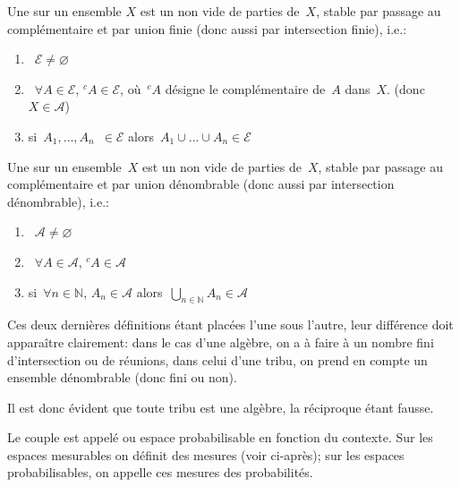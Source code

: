 \medskip
\begin{definition}[Algèbre]
Une  sur un ensemble $X$ est un  non vide de parties de~$X$, stable par passage au complémentaire et par union finie (donc aussi par intersection finie), i.e.:
\begin{enumerate}
 \item~$\mathcal{E} \not=\varnothing$
 \item~$\forall A \in \mathcal{E}$, ${}^c A \in\mathcal{E}$, où~${}^cA$ désigne le complémentaire de~$A$ dans~$X$.
	(donc~$X\in \mathcal{A}$)
\item si~$A_1,\ldots,A_n$~$\in\mathcal{E}$ alors~$A_1\cup ...\cup A_n \in\mathcal{E}$
\end{enumerate}
\end{definition}

\medskip
\begin{definition}[Tribu]\label{Def-tribu}
Une  sur un ensemble~$X$ est un  non vide de parties de~$X$, stable par passage au complémentaire et par union dénombrable (donc aussi par intersection dénombrable), i.e.:
\begin{enumerate}
 \item~$\mathcal{A} \not=\varnothing$
 \item~$\forall A \in \mathcal{A}$, ${}^c A \in\mathcal{A}$%
\item si~$\forall n \in \mathbb{N}$, $A_n \in\mathcal{A}$ alors~$\bigcup_{n\in\mathbb{N}} A_n \in\mathcal{A}$
\end{enumerate}
\end{definition}
\medskipvm
Ces deux dernières définitions étant placées l'une sous l'autre, leur différence doit apparaître clairement: dans le cas d'une algèbre, on a à faire à un nombre fini d'intersection ou de réunions, dans celui d'une tribu, on prend en compte un ensemble dénombrable (donc fini ou non).

\medskip
Il est donc évident que toute tribu est une algèbre, la réciproque étant fausse.

\medskip
\begin{definition}
Le couple  est appelé  ou espace probabilisable en fonction du contexte.
Sur les espaces mesurables on définit des mesures (voir ci-après); sur les espaces probabilisables, on appelle ces mesures des probabilités.
\end{definition}

